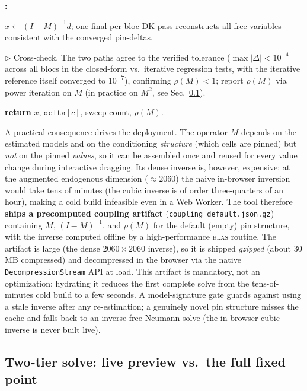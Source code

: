 \documentclass[11pt]{article}
\newcounter{algstep}
\newenvironment{algsteps}
  {\begin{list}{\textbf{\arabic{algstep}:}}{\usecounter{algstep}%
     \setlength{\leftmargin}{2.0em}\setlength{\labelwidth}{1.6em}%
     \setlength{\itemsep}{1.5pt}\setlength{\parsep}{0pt}%
     \setlength{\topsep}{2pt}}}
  {\end{list}}
\newcommand{\algInd}{\hspace*{1.4em}}
\newcommand{\algKw}[1]{\textbf{#1}}
\newcommand{\algComment}[1]{{\color{black!55}\(\triangleright\) #1}}
\theoremstyle{definition}
\theoremstyle{remark}
\begin{document}
\begin{algorithm}[!ht]
\begin{algsteps}
\item \algInd $x \gets (I-M)^{-1} d$; one final per-bloc DK pass reconstructs all free variables consistent with the converged pin-deltas.
\item \algComment{Cross-check.} The two paths agree to the verified tolerance ($\max|\Delta|<10^{-4}$ across all blocs in the closed-form vs.\ iterative regression tests, with the iterative reference itself converged to $10^{-7}$), confirming $\rho(M)<1$; report $\rho(M)$ via power iteration on $M$ (in practice on $M^2$, see Sec.~\ref{sec:gvar:solvemode}).
\item \algKw{return} $x$, $\texttt{delta}[c]$, sweep count, $\rho(M)$.
\end{algsteps}
\end{algorithm}

A practical consequence drives the deployment. The operator $M$ depends on the
estimated models and on the conditioning \emph{structure} (which cells are
pinned) but \emph{not} on the pinned \emph{values}, so it can be assembled once
and reused for every value change during interactive dragging. Its dense inverse
is, however, expensive: at the augmented endogenous dimension ($\approx 2060$)
the naive in-browser inversion would take tens of minutes (the cubic inverse is
of order three-quarters of an hour), making a cold build infeasible even in a
Web Worker. The tool therefore \textbf{ships a precomputed coupling artifact}
(\texttt{coupling\_default.json.gz}) containing $M$, $(I-M)^{-1}$, and $\rho(M)$
for the default (empty) pin structure, with the inverse computed offline by a
high-performance \textsc{blas} routine. The artifact is large (the dense
$2060\times2060$ inverse), so it is shipped \emph{gzipped} (about $30$\,MB
compressed) and decompressed in the browser via the native
\texttt{DecompressionStream} API at load. This artifact is mandatory, not an
optimization: hydrating it reduces the first complete solve from the
tens-of-minutes cold build to a few seconds. A model-signature gate guards
against using a stale inverse after any re-estimation; a genuinely novel pin
structure misses the cache and falls back to an inverse-free Neumann solve
(the in-browser cubic inverse is never built live).

\subsection{Two-tier solve: live preview vs.\ the full fixed point}\label{sec:gvar:solvemode}
\end{document}
